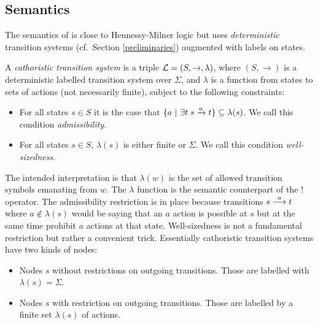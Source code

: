 \subsection{Semantics}

\NI The semantics of \cathoristic{} is close to Hennessy-Milner logic
\cite{HennessyM:alglawfndac} but uses \emph{deterministic} transition
systems (cf.~Section \ref{preliminaries}) augmented with labels on
states.



\begin{definition}
A \emph{cathoristic transition system} is a triple $\mathcal{L} = (S,
\rightarrow, \lambda)$, where $(S, \rightarrow)$ is a deterministic
labelled transition system over $\Sigma$, and $\lambda$ is a function
from states to sets of actions (not necessarily finite), subject to
the following constraints:
\begin{itemize}

\item For all states $s \in S$ it is the case that $ \{a \ | \  \exists
  t \; s \xrightarrow{a} t\} \subseteq \lambda(s)$. We call this
  condition \emph{admissibility}.

\item For all states $s \in S$, $\lambda (s)$ is either finite or
  $\Sigma$. We call this condition \emph{well-sizedness}.

\end{itemize}
\end{definition}

\NI The intended interpretation is that $\lambda(w)$ is the set of
allowed transition symbols emanating from $w$.  The $\lambda$ function
is the semantic counterpart of the $!$ operator.  The admissibility
restriction is in place because transitions $s \stackrel{a}{\longrightarrow} t$ where $a
\notin \lambda(s)$ would be saying that an $a$ action is possible at
$s$ but at the same time prohibit $a$ actions at that state.
Well-sizedness is not a fundamental restriction but rather a
convenient trick. Essentially cathoristic transition systems have two kinds
of nodes:

\begin{itemize}

\item Nodes $s$ without restrictions on outgoing transitions. Those are
  labelled with $\lambda ( s) = \Sigma$.

\item Nodes $s$ with restriction on outgoing transitions. Those are
  labelled by a finite set $\lambda ( s)$ of actions.

\end{itemize}

